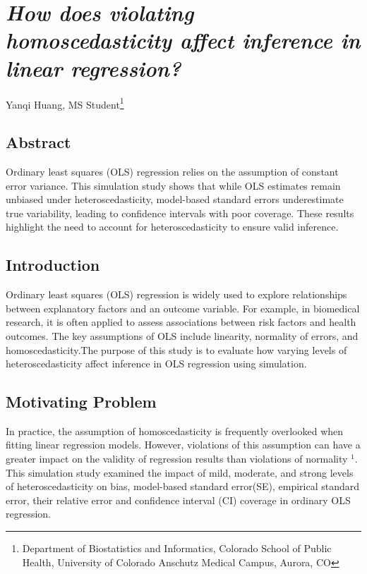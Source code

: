 \documentclass[
  twocolumn]{article}
\author{}
\date{\vspace{-2.5em}}
\begin{document}
\section{\texorpdfstring{\textit{How does violating homoscedasticity affect inference in linear regression?}}{}}\label{section}

Yanqi Huang, MS Student\footnote{Department of Biostatistics and Informatics, Colorado School of Public Health, University of Colorado Anschutz Medical Campus, Aurora, CO}

\subsection{Abstract}\label{abstract}

Ordinary least squares (OLS) regression relies on the assumption of constant error variance. This simulation study shows that while OLS estimates remain unbiased under heteroscedasticity, model-based standard errors underestimate true variability, leading to confidence intervals with poor coverage. These results highlight the need to account for heteroscedasticity to ensure valid inference.

\subsection{Introduction}\label{introduction}

Ordinary least squares (OLS) regression is widely used to explore relationships between explanatory factors and an outcome variable. For example, in biomedical research, it is often applied to assess associations between risk factors and health outcomes. The key assumptions of OLS include linearity, normality of errors, and homoscedasticity.The purpose of this study is to evaluate how varying levels of heteroscedasticity affect inference in OLS regression using simulation.

\subsection{Motivating Problem}\label{motivating-problem}

In practice, the assumption of homoscedasticity is frequently overlooked when fitting linear regression models. However, violations of this assumption can have a greater impact on the validity of regression results than violations of normality \(^1\). This simulation study examined the impact of mild, moderate, and strong levels of heteroscedasticity on bias, model-based standard error(SE), empirical standard error, their relative error and confidence interval (CI) coverage in ordinary OLS regression.
\end{document}
